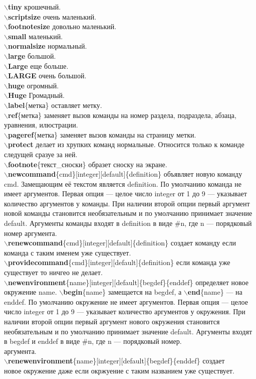 \documentclass{article}
\newcommand{\bs}{$\backslash$}
\newcommand{\bd}[1]{{\bfseries #1}} %
\newcommand{\bb}[1]{\bd{\bs #1}} %
\begin{document}
\bb{tiny} {\tiny крошечный}.\\
\bb{scriptsize} {\scriptsize очень маленький}.\\
\bb{footnotesize} {\footnotesize довольно маленький}.\\
\bb{small} {\small маленький}.\\
\bb{normalsize} {\normalsize нормальный}.\\
\bb{large} {\large большой}.\\
\bb{Large} {\Large еще больше}.\\
\bb{LARGE} {\LARGE очень большой}.\\
\bb{huge} {\huge огромный}.\\
\bb{Huge} {\Huge Громадный}.\\

\bb{label}\{метка\} оставляет метку.\\
\bb{ref}\{метка\} заменяет вызов команды на номер раздела, подраздела,
абзаца, уравнения, илюстрации.\\
\bb{pageref}\{метка\} заменяет вызов команды на страницу метки.\\
\bb{protect} делает из хрупких команд нормальные.
Относится только к команде следущей сразуе за ней.\\
\bb{footnote}\{текст\_сноски\} образет сноску на экране.\\

\bb{newcommand}\{cmd\}[integer][default]\{definition\} объявляет новую команду
cmd. Замещающим её текстом является definition. По умолчанию команда не имеет
аргументов. Первая опция — целое число integer от 1 до 9 — указывает количество
аргументов у команды. При наличии второй опции первый аргумент новой команды
становится необязательным и по умолчанию принимает значение default. Аргументы
команды входят в definition в виде \#n, где n — порядковый номер аргумента.\\
\bb{renewcommand}\{cmd\}[integer][default]\{definition\} создает команду если
команда с таким именем уже существует.\\
\bb{providecommand}\{cmd\}[integer][default]\{definition\} если команда уже
существует то ничгео не делает.\\

\bb{newenvironment}\{name\}[integer][default]\{begdef\}\{enddef\} определяет
новое окружение name. \bb{begin}\{name\} замещается на begdef,
а \bb{end}\{name\} — на enddef. По умолчанию окружение не имеет аргументов.
Первая опция — целое число integer от 1 до 9 — указывает количество аргументов
у окружения. При наличии второй опции первый аргумент нового окружения
становится необязательным и по умолчанию принимает значение default.
Аргументы входят в begdef и enddef в виде \#n, где n — порядковый номер.\\
аргумента.\\
\bb{renewenvironment}\{name\}[integer][default]\{begdef\}\{enddef\} создает\\
новое окружение даже если окржуение с таким названием уже существует.\\
\end{document}
